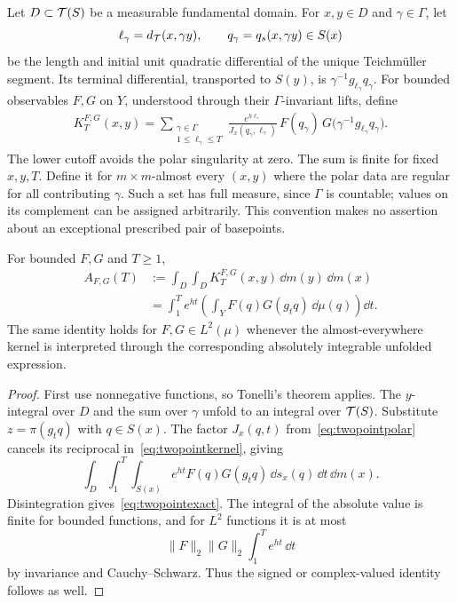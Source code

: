 Let $D\subset\mathcal T(S)$ be a measurable fundamental domain. For $x,y\in D$
and $\gamma\in\Gamma$, let
\[
 \ell_\gamma=d_{\mathcal T}(x,\gamma y),\qquad
 q_\gamma=q_s(x,\gamma y)\in S(x)
\]
be the length and initial unit quadratic differential of the unique
Teichm\"uller segment. Its terminal differential, transported to
$S(y)$, is $\gamma^{-1}g_{\ell_\gamma}q_\gamma$.
For bounded observables $F,G$ on $Y$, understood through their
$\Gamma$-invariant lifts, define
\begin{equation}
 \begin{split}
 K_T^{F,G}(x,y)
  =\sum_{\substack{\gamma\in\Gamma\\1\leq\ell_\gamma\leq T}}
   \frac{e^{h\ell_\gamma}}{J_x(q_\gamma,\ell_\gamma)}\,
   F(q_\gamma)\,
   G\bigl(\gamma^{-1}g_{\ell_\gamma}q_\gamma\bigr).
 \end{split}
 \label{eq:twopointkernel}
\end{equation}
The lower cutoff avoids the polar singularity at zero. The sum is
finite for fixed $x,y,T$. Define it for $m\times m$-almost every
$(x,y)$ where the polar data are regular for all contributing
$\gamma$. Such a set has full measure, since $\Gamma$ is
countable; values on its complement can be assigned arbitrarily.
This convention makes no assertion about an exceptional prescribed
pair of basepoints.

\begin{proposition}
\label{prop:twopointunfolding}
For bounded $F,G$ and $T\geq1$,
\begin{equation}
 \begin{split}
 A_{F,G}(T)
 &:=\int_D\int_D K_T^{F,G}(x,y)\,\dd m(y)\,\dd m(x)\\
 &=\int_1^T e^{ht}
      \left(\int_Y F(q)G(g_tq)\,\dd\mu(q)\right)\dd t.
 \end{split}
 \label{eq:twopointexact}
\end{equation}
The same identity holds for $F,G\in L^2(\mu)$ whenever the
almost-everywhere kernel is interpreted through the corresponding
absolutely integrable unfolded expression.
\end{proposition}

\begin{proof}
First use nonnegative functions, so Tonelli's theorem applies.
The $y$-integral over $D$ and the sum over $\gamma$ unfold to an
integral over $\mathcal T(S)$. Substitute $z=\pi(g_tq)$ with $q\in S(x)$.
The factor $J_x(q,t)$ from~\eqref{eq:twopointpolar} cancels its
reciprocal in~\eqref{eq:twopointkernel}, giving
\[
 \int_D\int_1^T\int_{S(x)}
     e^{ht}F(q)G(g_tq)\,\dd s_x(q)\,\dd t\,\dd m(x).
\]
Disintegration gives~\eqref{eq:twopointexact}. The integral of the
absolute value is finite for bounded functions, and for $L^2$
functions it is at most
\[
 \|F\|_2\|G\|_2\int_1^T e^{ht}\,\dd t
\]
by invariance and Cauchy--Schwarz. Thus the signed or complex-valued
identity follows as well.
\end{proof}

